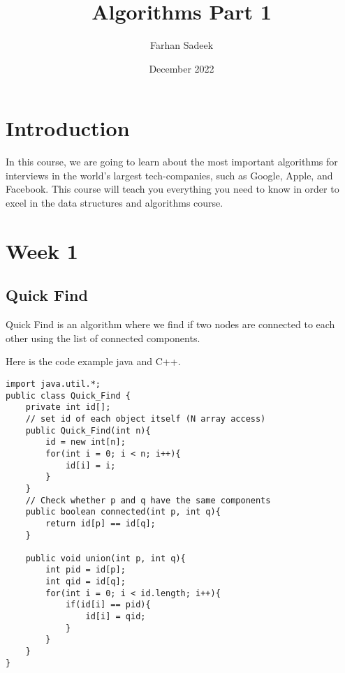 \documentclass{article}
\title{Algorithms Part 1}
\author{Farhan Sadeek}
\date{December 2022}
\begin{document}
\maketitle

\section{Introduction}
In this course, we are going to learn about the most important algorithms for interviews in the world's largest tech-companies, such as Google, Apple, and Facebook. This course will teach you everything you need to know in order to excel in the data structures and algorithms course.

\section{Week 1}
\subsection{Quick Find}
Quick Find is an algorithm where we find if two nodes are connected to each other using the list of connected components.
\newline
\newline
{} 
Here is the code example java and C++.

\begin{verbatim}
import java.util.*;
public class Quick_Find {
    private int id[];
    // set id of each object itself (N array access)
    public Quick_Find(int n){
        id = new int[n];
        for(int i = 0; i < n; i++){
            id[i] = i;
        }
    }
    // Check whether p and q have the same components
    public boolean connected(int p, int q){
        return id[p] == id[q];
    }

    public void union(int p, int q){
        int pid = id[p];
        int qid = id[q];
        for(int i = 0; i < id.length; i++){
            if(id[i] == pid){
                id[i] = qid;
            }
        }
    }
}
\end{verbatim}
\end{document}
